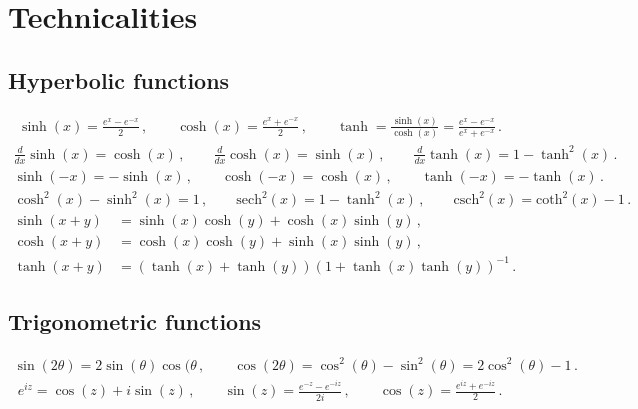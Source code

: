 \documentclass[11pt, onesided]{book}
\theoremstyle{break}
\theoremstyle{break}
\begin{document}
\tableofcontents
\hfill\break
\hfill\break
\hfill\break
 

\newpage
\section[Technicalities]{\color{red}Technicalities\color{black}}
\subsection*{Hyperbolic functions}
\begin{align*}
\sinh(x) = \frac{e^x - e^{-x}}{2}\,,\qquad
\cosh(x) = \frac{e^x + e^{-x}}{2}\,,\qquad
\tanh = \frac{\sinh(x)}{\cosh(x)} = \frac{e^x - e^{-x}}{e^x+ e^{-x}}\,.
\end{align*}
\begin{align*}
\frac{d}{dx}\sinh(x) = \cosh(x)\,,\qquad
\frac{d}{dx}\cosh(x) = \sinh(x)\,,\qquad
\frac{d}{dx}\tanh(x) = 1-\tanh^2(x)\,.
\end{align*}
\begin{align*}
\sinh(-x) = -\sinh(x) \,,\qquad \cosh(-x) = \cosh(x) \,,\qquad
\tanh(-x) = -\tanh(x)\,.
\end{align*}
\begin{align*}
\cosh^2(x) - \sinh^2(x) =1\,,\qquad
\text{sech}^2(x) = 1- \tanh^2(x)\,,\qquad
\text{csch}^2(x) = \text{coth}^2(x)-1\,.
\end{align*}
\begin{align*}
\sinh(x+y) &= \sinh(x) \cosh(y) + \cosh(x) \sinh(y)\,,\\
\cosh(x+y) &= \cosh(x) \cosh(y) + \sinh(x) \sinh(y)\,,\\
\tanh(x+y) &= (\tanh(x) + \tanh(y))({1+ \tanh(x) \tanh(y)})^{-1}\,.
\end{align*}
\subsection*{Trigonometric functions}
\begin{align*}
\sin(2\theta) = 2\sin(\theta) \cos(\theta\,,\qquad
\cos(2\theta) = \cos^2(\theta) - \sin^2(\theta) = 2\cos^2(\theta)-1\,.
\end{align*}
\begin{align*}
e^{iz} = \cos(z) + i\sin(z)\,,\qquad \sin(z) = \frac{e^{-z} - e^{-iz}}{2i}\,,\qquad \cos(z) = \frac{e^{iz} + e^{-iz}}{2}\,.
\end{align*}
\hfill\break
\end{document}
